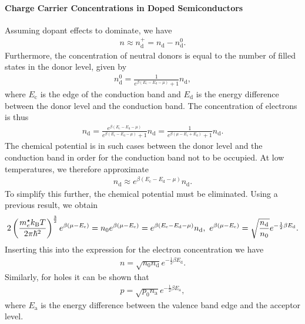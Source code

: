 \paragraph{Charge Carrier Concentrations in Doped Semiconductors}
Assuming dopant effects to dominate, we have
\begin{align*}
	n \approx n_{\text{d}}^{+} = n_{\text{d}} - n_{\text{d}}^{0}.
\end{align*}
Furthermore, the concentration of neutral donors is equal to the number of filled states in the donor level, given by
\begin{align*}
	n_{\text{d}}^{0} = \frac{1}{e^{\beta(E_{\text{c}} - E_{\text{d}} - \mu)} + 1}n_{\text{d}},
\end{align*}
where $E_{\text{c}}$ is the edge of the conduction band and $E_{\text{d}}$ is the energy difference between the donor level and the conduction band. The concentration of electrons is thus
\begin{align*}
	n_{\text{d}} = \frac{e^{\beta(E_{\text{c}} - E_{\text{d}} - \mu)}}{e^{\beta(E_{\text{c}} - E_{\text{d}} - \mu)} + 1}n_{\text{d}} = \frac{1}{e^{\beta(\mu - E_{\text{c}} + E_{\text{d}})} + 1}n_{\text{d}}.
\end{align*}
The chemical potential is in such cases between the donor level and the conduction band in order for the conduction band not to be occupied. At low temperatures, we therefore approximate
\begin{align*}
	n_{\text{d}} \approx e^{\beta(E_{\text{c}} - E_{\text{d}} - \mu)}n_{\text{d}}.
\end{align*}
To simplify this further, the chemical potential must be eliminated. Using a previous result, we obtain
\begin{align*}
	2\left(\frac{m^{\star}_{e}k_{\text{B}} T}{2\pi\hbar^{2}}\right)^{\frac{3}{2}}e^{\beta(\mu - E_{\text{c}})} = n_{0}e^{\beta(\mu - E_{\text{c}})} = e^{\beta(E_{\text{c}} - E_{\text{d}} - \mu)}n_{\text{d}},\ e^{\beta(\mu - E_{\text{c}})} = \sqrt{\frac{n_{\text{d}}}{n_{0}}}e^{-\frac{1}{2}\beta E_{\text{d}}}.
\end{align*}
Inserting this into the expression for the electron concentration we have
\begin{align*}
	n = \sqrt{n_{0}n_{\text{d}}}e^{-\frac{1}{2}\beta E_{\text{d}}}.
\end{align*}
Similarly, for holes it can be shown that
\begin{align*}
	p = \sqrt{p_{0}n_{\text{a}}}e^{-\frac{1}{2}\beta E_{\text{a}}},
\end{align*}
where $E_{\text{a}}$ is the energy difference between the valence band edge and the acceptor level.

